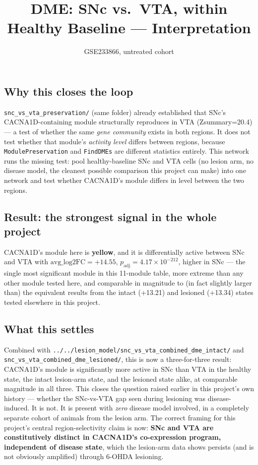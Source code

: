 \documentclass[11pt]{article}
\title{DME: SNc vs.\ VTA, within Healthy Baseline --- Interpretation}
\author{GSE233866, untreated cohort}
\date{}
\begin{document}
\maketitle

\subsection*{Why this closes the loop}

\texttt{snc\_vs\_vta\_preservation/} (same folder) already established that SNc's
CACNA1D-containing module structurally reproduces in VTA (Zsummary=20.4) --- a test of
whether the same \emph{gene community} exists in both regions. It does not test whether
that module's \emph{activity level} differs between regions, because \texttt{ModulePreservation}
and \texttt{FindDMEs} are different statistics entirely. This network runs the missing test:
pool healthy-baseline SNc and VTA cells (no lesion arm, no disease model, the cleanest
possible comparison this project can make) into one network and test whether CACNA1D's
module differs in level between the two regions.

\subsection*{Result: the strongest signal in the whole project}

CACNA1D's module here is \textbf{yellow}, and it is differentially active between SNc and
VTA with $\mathrm{avg\_log2FC}=+14.55$, $p_{\mathrm{adj}}=4.17\times10^{-212}$, higher in
SNc --- the single most significant module in this 11-module table, more extreme than any
other module tested here, and comparable in magnitude to (in fact slightly larger than) the
equivalent results from the intact (+13.21) and lesioned (+13.34) states tested elsewhere in
this project.

\subsection*{What this settles}

Combined with \texttt{../../lesion\_model/snc\_vs\_vta\_combined\_dme\_intact/} and
\texttt{snc\_vs\_vta\_combined\_dme\_lesioned/}, this is now a three-for-three result: CACNA1D's
module is significantly more active in SNc than VTA in the healthy state, the intact
lesion-arm state, and the lesioned state alike, at comparable magnitude in all three. This
closes the question raised earlier in this project's own history --- whether the SNc-vs-VTA
gap seen during lesioning was disease-induced. It is not. It is present with \emph{zero}
disease model involved, in a completely separate cohort of animals from the lesion arm. The
correct framing for this project's central region-selectivity claim is now: \textbf{SNc and
VTA are constitutively distinct in CACNA1D's co-expression program, independent of disease
state}, which the lesion-arm data shows persists (and is not obviously amplified) through
6-OHDA lesioning.
\end{document}
